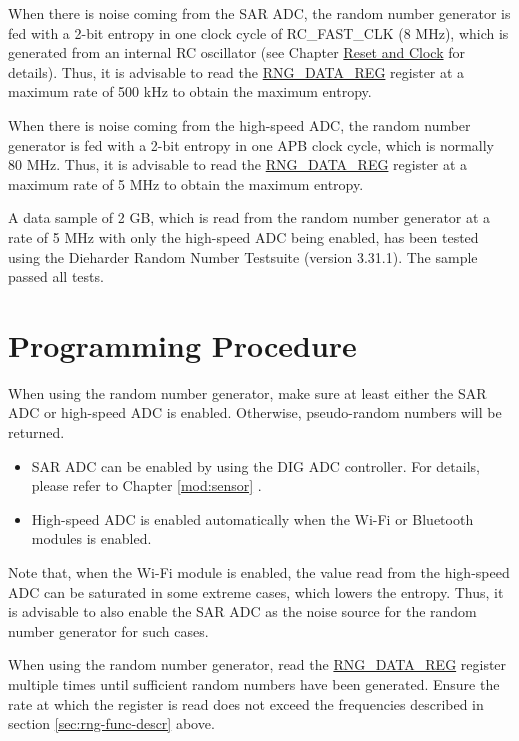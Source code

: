 \documentclass[main\_\_EN.tex]{subfiles}
\begin{document}
When there is noise coming from the SAR ADC, the random number generator is fed with a 2-bit entropy in one clock cycle of RC\_FAST\_CLK (8 MHz), which is generated from an internal RC oscillator (see Chapter \hyperref[mod:resclk]{Reset and Clock} for details). Thus, it is advisable to read the \hyperref[regdesc:RNGDATAREG]{RNG\_DATA\_REG} register at a maximum rate of 500 kHz to obtain the maximum entropy.

When there is noise coming from the high-speed ADC, the random number generator is fed with a 2-bit entropy in one APB clock cycle, which is normally 80 MHz. Thus, it is advisable to read the \hyperref[regdesc:RNGDATAREG]{RNG\_DATA\_REG}
register at a maximum rate of 5 MHz to obtain the maximum entropy.

A data sample of 2 GB, which is read from the random number generator at a rate of 5 MHz with only the high-speed ADC being enabled, has been tested using the Dieharder Random Number Testsuite (version 3.31.1). The sample passed all tests.

\section{Programming Procedure}\label{sec:rng-programming}

When using the random number generator, make sure at least either the SAR ADC or high-speed ADC is enabled. Otherwise, pseudo-random numbers will be returned.
\begin{itemize}
    \item SAR ADC can be enabled by using the DIG ADC controller. For details, please refer to Chapter \ref{mod:sensor} \textit{}.
    \item High-speed ADC is enabled automatically when the Wi-Fi or Bluetooth modules is enabled.
\end{itemize}

\begin{tiplisting}
Note that, when the Wi-Fi module is enabled, the value read from the high-speed ADC can be saturated in some extreme cases, which lowers the entropy. Thus, it is advisable to also enable the SAR ADC as the noise source for the random number generator for such cases.
\end{tiplisting}

When using the random number generator, read the \hyperref[regdesc:RNGDATAREG]{RNG\_DATA\_REG} register multiple times until sufficient random numbers have been generated. Ensure the rate at which the register is read does not exceed the frequencies described in section \ref{sec:rng-func-descr} above.
\end{document}
